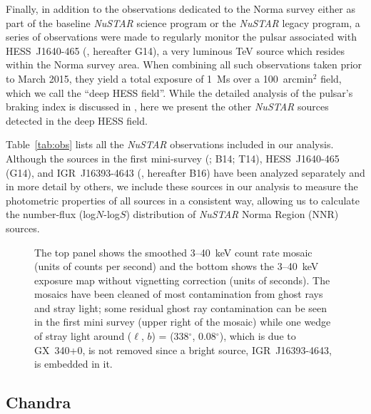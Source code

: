 \documentclass[iop,revtex4]{emulateapj}
\begin{document}
Finally, in addition to the observations dedicated to the Norma survey either as part of the baseline \textit{NuSTAR} science program or the \textit{NuSTAR} legacy program, a series of observations were made to regularly monitor the pulsar associated with HESS~J1640-465 (\citealt{gotthelf14}, hereafter G14), a very luminous TeV source which resides within the Norma survey area.  When combining all such observations taken prior to March 2015, they yield a total exposure of 1~Ms over a 100~arcmin$^2$ field, which we call the ``deep HESS field''.  While the detailed analysis of the pulsar's braking index is discussed in \citet{archibald16}, here we present the other \textit{NuSTAR} sources detected in the deep HESS field. \par
Table~\ref{tab:obs} lists all the \textit{NuSTAR} observations included in our analysis.  Although the sources in the first mini-survey (\citealt{king14}; B14; T14), HESS~J1640-465 (G14), and IGR~J16393-4643 (\citealt{bodaghee16}, hereafter B16) have been analyzed separately and in more detail by others, we include these sources in our analysis to measure the photometric properties of all sources in a consistent way, allowing us to calculate the number-flux (log$N$-log$S$) distribution of \textit{NuSTAR} Norma Region (NNR) sources.  

\begin{figure*}[t]
	\centering	
\caption{The top panel shows the smoothed 3--40~keV count rate mosaic (units of counts per second) and the bottom shows the 3--40~keV exposure map without vignetting correction (units of seconds).  The mosaics have been cleaned of most contamination from ghost rays and stray light; some residual ghost ray contamination can be seen in the first mini survey (upper right of the mosaic) while one wedge of stray light around ($\ell$, $b$) = (338$^{\circ}$, 0.08$^{\circ}$), which is due to GX~340+0, is not removed since a bright source, IGR~J16393-4643, is embedded in it.} 
\label{fig:mosaic}
\end{figure*}

\subsection{Chandra}
\end{document}
